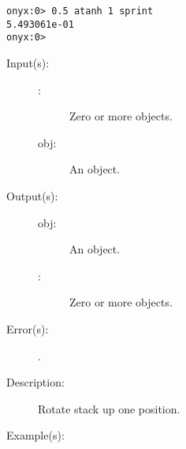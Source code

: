 \begin{description}
\begin{description}
\begin{verbatim}
onyx:0> 0.5 atanh 1 sprint
5.493061e-01
onyx:0>
		\end{verbatim}
	\end{description}
\label{systemdict:aup}
\item[{\onyxop{\commas obj}{aup}{obj \commas}}: ]
	\begin{description}\item[]
	\item[Input(s): ]
		\begin{description}\item[]
		\item[\commas: ]
			Zero or more objects.
		\item[obj: ]
			An object.
		\end{description}
	\item[Output(s): ]
		\begin{description}\item[]
		\item[obj: ]
			An object.
		\item[\commas: ]
			Zero or more objects.
		\end{description}
	\item[Error(s): ]
		\begin{description}\item[]
		\item[.]
		\end{description}
	\item[Description: ]
		Rotate stack up one position.
	\item[Example(s): ]\begin{verbatim}


\end{verbatim}
\end{description}
\end{description}
